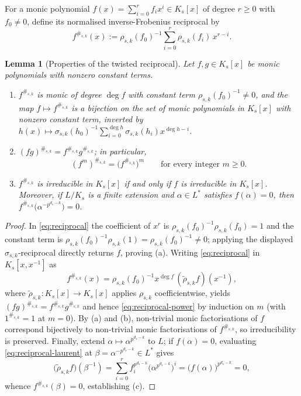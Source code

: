 \documentclass[preprint,12pt]{elsarticle}
\numberwithin{equation}{section}
\theoremstyle{plain}
\newtheorem{lemma}[theorem]{Lemma}
\theoremstyle{definition}
\theoremstyle{remark}
\begin{document}
For a monic polynomial $f(x)=\sum_{i=0}^{r}f_i x^i\in K_s[x]$ of degree $r\ge 0$
with $f_0\neq 0$, define its normalised inverse-Frobenius reciprocal by
\begin{equation}\label{eq:reciprocal}
f^{\#_{s,k}}(x):=\rho_{s,k}(f_0)^{-1}\sum_{i=0}^{r}\rho_{s,k}(f_i)\,x^{r-i}.
\end{equation}

\begin{lemma}[Properties of the twisted reciprocal]\label{lem:reciprocal-props}
Let $f,g\in K_s[x]$ be monic polynomials with nonzero constant terms.
\begin{enumerate}
\item[\textup{(a)}] $f^{\#_{s,k}}$ is monic of degree $\deg f$ with constant term
$\rho_{s,k}(f_0)^{-1}\neq 0$, and the map $f\mapsto f^{\#_{s,k}}$ is a bijection
on the set of monic polynomials in $K_s[x]$ with nonzero constant term, inverted
by $h(x)\mapsto \sigma_{s,k}(h_0)^{-1}\sum_{i=0}^{\deg h}\sigma_{s,k}(h_i)x^{\deg h-i}$.
\item[\textup{(b)}] $(fg)^{\#_{s,k}}=f^{\#_{s,k}}g^{\#_{s,k}}$; in particular,
\begin{equation}\label{eq:reciprocal-power}
(f^m)^{\#_{s,k}}=\bigl(f^{\#_{s,k}}\bigr)^m
\qquad\text{for every integer }m\ge 0.
\end{equation}
\item[\textup{(c)}] $f^{\#_{s,k}}$ is irreducible in $K_s[x]$ if and only if $f$
is irreducible in $K_s[x]$. Moreover, if $L/K_s$ is a finite extension and
$\alpha\in L^*$ satisfies $f(\alpha)=0$, then
$f^{\#_{s,k}}\bigl(\alpha^{-p^{d_s-k}}\bigr)=0$.
\end{enumerate}
\end{lemma}

\begin{proof}
In \eqref{eq:reciprocal} the coefficient of $x^r$ is
$\rho_{s,k}(f_0)^{-1}\rho_{s,k}(f_0)=1$ and the constant term is
$\rho_{s,k}(f_0)^{-1}\rho_{s,k}(1)=\rho_{s,k}(f_0)^{-1}\neq 0$; applying the
displayed $\sigma_{s,k}$-reciprocal directly returns $f$, proving \textup{(a)}.
Writing \eqref{eq:reciprocal} in $K_s[x,x^{-1}]$ as
\begin{equation}\label{eq:reciprocal-laurent}
f^{\#_{s,k}}(x)=\rho_{s,k}(f_0)^{-1}x^{\deg f}\,(\widetilde{\rho}_{s,k}f)(x^{-1}),
\end{equation}
where $\widetilde{\rho}_{s,k}:K_s[x]\to K_s[x]$ applies $\rho_{s,k}$
coefficientwise, yields $(fg)^{\#_{s,k}}=f^{\#_{s,k}}g^{\#_{s,k}}$ and hence
\eqref{eq:reciprocal-power} by induction on $m$ (with $1^{\#_{s,k}}=1$ at $m=0$).
By \textup{(a)} and \textup{(b)}, non-trivial monic factorisations of $f$ correspond
bijectively to non-trivial monic factorisations of $f^{\#_{s,k}}$, so
irreducibility is preserved. Finally, extend $\alpha\mapsto\alpha^{p^{d_s-k}}$ to
$L$; if $f(\alpha)=0$, evaluating \eqref{eq:reciprocal-laurent} at
$\beta=\alpha^{-p^{d_s-k}}\in L^*$ gives
\[
\bigl(\widetilde{\rho}_{s,k}f\bigr)(\beta^{-1})
 =\sum_{i=0}^{r}f_i^{p^{d_s-k}}\bigl(\alpha^{p^{d_s-k}}\bigr)^i
 =\bigl(f(\alpha)\bigr)^{p^{d_s-k}}=0,
\]
whence $f^{\#_{s,k}}(\beta)=0$, establishing \textup{(c)}.
\end{proof}
\end{document}
